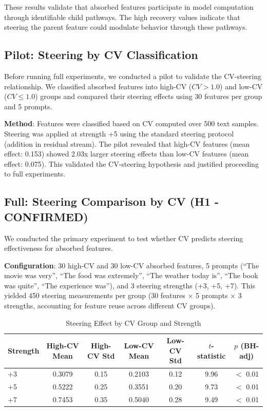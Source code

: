 \documentclass{article}
\begin{document}
These results validate that absorbed features participate in model computation through identifiable child pathways. The high recovery values indicate that steering the parent feature could modulate behavior through these pathways.

\subsection{Pilot: Steering by CV Classification}

Before running full experiments, we conducted a pilot to validate the CV-steering relationship. We classified absorbed features into high-CV ($CV > 1.0$) and low-CV ($CV \le 1.0$) groups and compared their steering effects using 30 features per group and 5 prompts.

\textbf{Method}: Features were classified based on CV computed over 500 text samples. Steering was applied at strength +5 using the standard steering protocol (addition in residual stream). The pilot revealed that high-CV features (mean effect: 0.153) showed 2.03x larger steering effects than low-CV features (mean effect: 0.075). This validated the CV-steering hypothesis and justified proceeding to full experiments.

\subsection{Full: Steering Comparison by CV (H1 - CONFIRMED)}

We conducted the primary experiment to test whether CV predicts steering effectiveness for absorbed features.

\textbf{Configuration}: 30 high-CV and 30 low-CV absorbed features, 5 prompts (``The movie was very'', ``The food was extremely'', ``The weather today is'', ``The book was quite'', ``The experience was''), and 3 steering strengths (+3, +5, +7). This yielded 450 steering measurements per group (30 features $\times$ 5 prompts $\times$ 3 strengths, accounting for feature reuse across different CV groups).

\begin{table}[t]
\caption{Steering Effect by CV Group and Strength}
\label{tab:steering_cv}
\centering
\small
\begin{tabular}{lcccccc}
\toprule
Strength & High-CV Mean & High-CV Std & Low-CV Mean & Low-CV Std & $t$-statistic & $p$ (BH-adj) \\
\midrule
+3 & 0.3079 & 0.15 & 0.2103 & 0.12 & 9.96 & $<$ 0.01 \\
+5 & 0.5222 & 0.25 & 0.3551 & 0.20 & 9.73 & $<$ 0.01 \\
+7 & 0.7453 & 0.35 & 0.5040 & 0.28 & 9.49 & $<$ 0.01 \\
\bottomrule
\end{tabular}
\end{table}
\end{document}
